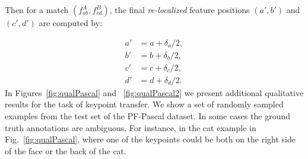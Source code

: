 \documentclass{article}
\begin{document}
Then for a match $(f^A_{ab},f^B_{cd})$, the final \emph{re-localized} feature positions $(a',b')$ and $(c',d')$ are computed by:

\begin{equation}
\begin{split}
a'&=a+\delta_a/2,\\
b'&=b+\delta_b/2,\\
c'&=c+\delta_c/2,\\
d'&=d+\delta_d/2.
\end{split}
\end{equation}%
In Figures~\ref{fig:qualPascal} and ~\ref{fig:qualPascal2} we present additional qualitative results for the task of keypoint transfer. We show a set of randomly sampled examples from the test set of the PF-Pascal dataset. In some cases the ground truth annotations are ambiguous. For instance, in the cat example in Fig.~\ref{fig:qualPascal}, where one of the keypoints could be both on the right side of the face or the back of the cat.
\end{document}
